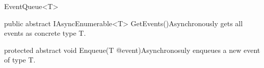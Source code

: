 \begin{absclass}{EventQueue<T>}


    \begin{methods}
        \begin{method}{public abstract IAsyncEnumerable<T> GetEvents()}{Asynchronously gets all events as concrete type T.}
        \end{method}
        \begin{method}{protected abstract void Enqueue(T @event)}{Asynchronosuly enqueues a new event of type T.}
            \begin{parameters}
            \end{parameters}
        \end{method}
    \end{methods}
\end{absclass}